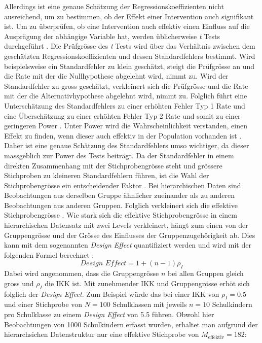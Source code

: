 \documentclass[12pt]{article}\usepackage[]{graphicx}\usepackage[]{color}
\begin{document}
Allerdings ist eine genaue Schätzung der Regressionskoeffizienten nicht ausreichend, um zu bestimmen, ob der Effekt einer Intervention auch signifikant ist. Um zu überprüfen, ob eine Intervention auch effektiv einen Einfluss auf die Ausprägung der abhängige Variable hat, werden üblicherweise \textit{t} Tests durchgeführt \citep{SnijdersTomA.B2012Ma:a}. Die Prüfgrösse des \textit{t} Tests wird über das Verhältnis zwischen dem geschätzten Regressionskoeffizienten und dessen Standardfehlers bestimmt. Wird beispielsweise ein Standardfehler zu klein geschätzt, steigt die Prüfgrösse an und die Rate mit der die Nullhypothese abgelehnt wird, nimmt zu. Wird der Standardfehler zu gross geschätzt, verkleinert sich die Prüfgrösse und die Rate mit der die Alternativhypothese abgelehnt wird, nimmt zu. Folglich führt eine Unterschätzung des Standardfehlers zu einer erhöhten Fehler Typ 1 Rate und eine Überschätzung zu einer erhöhten Fehler Typ 2 Rate und somit zu einer geringeren Power \citep{SnijdersTomA.B2012Ma:a}. Unter Power wird die Wahrscheinlichkeit verstanden, einen Effekt zu finden, wenn dieser auch effektiv in der Population vorhanden ist \citep{scherbaumferreter2009powersample}. Daher ist eine genaue Schätzung des Standardfehlers umso wichtiger, da dieser massgeblich zur Power des Tests beiträgt. Da der Standardfehler in einem direkten Zusammenhang mit der Stichprobengrösse steht und grössere Stichproben zu kleineren Standardfehlern führen, ist die Wahl der Stichprobengrösse ein entscheidender Faktor \citep{james2013introduction, SnijdersTomA.B2012Ma:a}. Bei hierarchischen Daten sind Beobachtungen aus derselben Gruppe ähnlicher zueinander als zu anderen Beobachtungen aus anderen Gruppen. Folglich verkleinert sich die effektive Stichprobengrösse \citep{raudenbush2002hierarchical}. Wie stark sich die effektive Stichprobengrösse in einem hierarchischen Datensatz mit zwei Levels verkleinert, hängt zum einen von der Gruppengrösse und der Grösse des Einflusses der Gruppenzugehörigkeit ab. Dies kann mit dem sogenannten \textit{Design Effect} quantifiziert werden und wird mit der folgenden Formel berechnet \citep{raudenbush2002hierarchical,SnijdersTomA.B2012Ma:a}:
\begin{equation}
\textit{Design Effect} = 1 + (n - 1) \rho_I
\end{equation}
Dabei wird angenommen, dass die Gruppengrösse $n$ bei allen Gruppen gleich gross und $\rho_I$ die IKK ist. Mit zunehmender IKK und Gruppengrösse erhöt sich folglich der \textit{Design Effect}. Zum Beispiel würde das bei einer IKK von $\rho_I = 0.5$ und einer Stichprobe von $N = 100$ Schulklassen mit jeweils $n = 10$ Schulkindern pro Schulklasse zu einem \textit{Design Effect} von 5.5 führen. Obwohl hier Beobachtungen von 1000 Schulkindern erfasst wurden, erhaltet man aufgrund der hierarchsichen Datenstruktur nur eine effektive Stichprobe von $M_{\text{effektiv}} = 182$:
\end{document}
